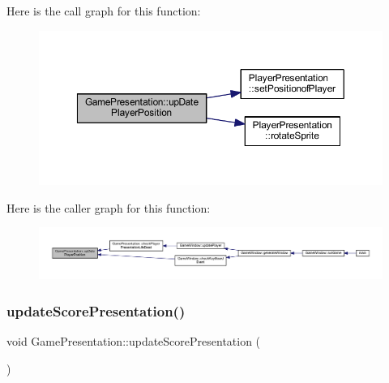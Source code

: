 Here is the call graph for this function\+:\nopagebreak
\begin{figure}[H]
\begin{center}
\leavevmode
\includegraphics[width=350pt]{class_game_presentation_a08abc97c6f65eda4ac7c54d55a9054b4_cgraph}
\end{center}
\end{figure}
Here is the caller graph for this function\+:
\nopagebreak
\begin{figure}[H]
\begin{center}
\leavevmode
\includegraphics[width=350pt]{class_game_presentation_a08abc97c6f65eda4ac7c54d55a9054b4_icgraph}
\end{center}
\end{figure}
\mbox{\label{class_game_presentation_ab2cf74842583bf5b63e5973fb8b657be}} 
\subsubsection{\texorpdfstring{update\+Score\+Presentation()}{updateScorePresentation()}}
{\footnotesize\ttfamily void Game\+Presentation\+::update\+Score\+Presentation (\begin{DoxyParamCaption}{ }\end{DoxyParamCaption})}

